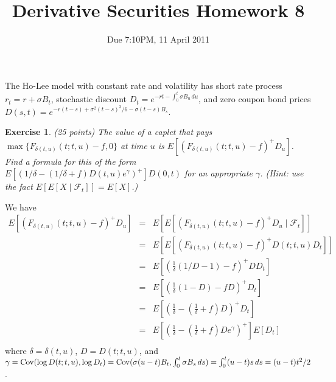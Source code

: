 \documentclass[11pt,fleqn]{amsproc}
\newcommand{\F}{\mathcal{F}}
\newcommand{\Cov}{\mathop{\rm{Cov}}}
\newtheorem{xca}{Exercise}
\begin{document}
\title{Derivative Securities Homework 8}
\author{Due 7:10PM, 11 April 2011}

\maketitle

The Ho-Lee model with constant rate and volatility has short rate
process $r_t = r + \sigma B_t$, stochastic discount
$D_t = e^{-rt - \int_0^t\sigma B_u\,du}$, and zero coupon bond prices
$D(s, t) = e^{-r(t - s) + \sigma^2(t - s)^3/6 - \sigma(t - s)B_s}$.

\begin{xca}{(25 points)}
The value of a caplet that pays
$\max\{F_{\delta(t,u)}(t;t, u) - f, 0\}$ at time $u$ 
is $E[(F_{\delta(t,u)}(t;t, u) - f)^+ D_u]$.
Find a formula for this of the form
$E[(1/\delta - (1/\delta + f)D(t, u)e^\gamma)^+]D(0, t)$
for an appropriate $\gamma$.
({\em Hint: use the fact $E[E[X\mid\F_t]] = E[X]$.})

\end{xca}

We have
\begin{eqnarray*}
E[(F_{\delta(t,u)}(t;t, u) - f)^+ D_u]
&=& E[E[(F_{\delta(t,u)}(t;t, u) - f)^+ D_u\mid\F_t]]\\
&=& E[E[(F_{\delta(t,u)}(t;t, u) - f)^+ D(t;t,u)D_t]]\\
&=& E[(\frac{1}{\delta}(1/D - 1) - f)^+ D D_t]\\
&=& E[(\frac{1}{\delta}(1 - D) - fD)^+ D_t]\\
&=& E[(\frac{1}{\delta} - (\frac{1}{\delta} + f)D)^+ D_t]\\
&=& E[(\frac{1}{\delta} - (\frac{1}{\delta} + f)De^\gamma)^+]E[D_t]\\
\end{eqnarray*}
where $\delta = \delta(t,u)$, $D = D(t;t,u)$, and 
$\gamma = \Cov(\log D(t;t,u), \log D_t)
= \Cov(\sigma (u - t)B_t, \int_0^t \sigma B_s \, ds)
= \int_0^t (u - t)s\, ds = (u - t)t^2/2$.
\end{document}
